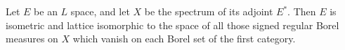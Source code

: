 Let $E$ be an $L$ space, and let $X$ be the spectrum of its adjoint $E^{*}$. Then $E$ is isometric and lattice isomorphic to the space of all those signed regular Borel measures on $X$ which vanish on each Borel set of the first category.
